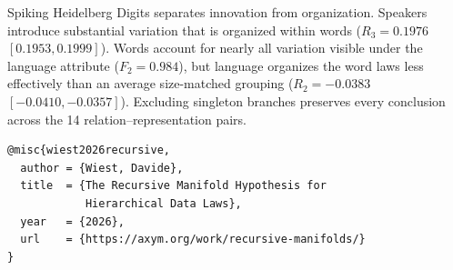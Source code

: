 \documentclass[11pt]{article}
\begin{document}
Spiking Heidelberg Digits separates innovation from organization. Speakers introduce substantial variation that is organized within words ($R_3=0.1976$ $[0.1953,0.1999]$). Words account for nearly all variation visible under the language attribute ($F_2=0.984$), but language organizes the word laws less effectively than an average size-matched grouping ($R_2=-0.0383$ $[-0.0410,-0.0357]$). Excluding singleton branches preserves every conclusion across the 14 relation--representation pairs.

\begin{publicationcitation}
\begin{verbatim}
@misc{wiest2026recursive,
  author = {Wiest, Davide},
  title  = {The Recursive Manifold Hypothesis for
            Hierarchical Data Laws},
  year   = {2026},
  url    = {https://axym.org/work/recursive-manifolds/}
}
\end{verbatim}
\end{publicationcitation}
\end{document}
